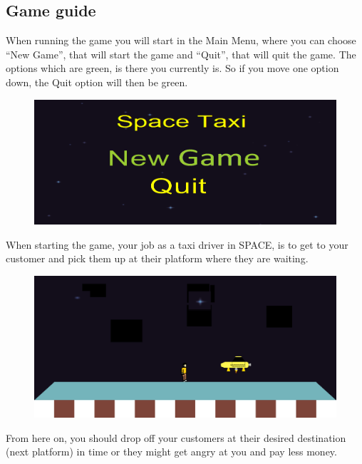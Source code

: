 \documentclass[../master.tex]{subfiles}
\begin{document}
\subsection{Game guide}
When running the game you will start in the Main Menu, where you can choose ``New Game'', that will start the game and ``Quit'', that will quit the game. The options which are green, is there you currently is. So if you move one option down, the Quit option will then be green.
\begin{figure}[h]
	\includegraphics[width=1\textwidth]{./Pictures/MainMenu2.png}
\end{figure}

When starting the game, your job as a taxi driver in SPACE, is to get to your customer and pick them up at their platform where they are waiting. 
\begin{figure}[h]
	\includegraphics[width=1\textwidth]{./Pictures/SpaceTaxiLandingNew3.png}
\end{figure}

From here on, you should drop off your customers at their desired destination (next platform) in time or they might get angry at you and pay less money.\\

\newpage
\end{document}
